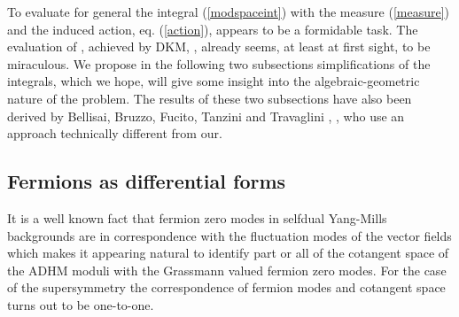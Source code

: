\documentclass[a4paper,12pt]{article}
\begin{document}
To evaluate for general \coordHE{} the integral (\ref{modspaceint}) with 
the measure (\ref{measure}) and the induced action, eq. 
(\ref{action}), appears to be a formidable task. The evaluation 
of \coordHE{}, achieved by DKM, \cite{dorey1}, already seems, at 
least at first 
sight, to be miraculous. We propose in the following two 
subsections simplifications of the integrals, which we hope, will 
give some insight into the algebraic-geometric nature of the 
problem. The results of these two subsections have also 
been derived by Bellisai, Bruzzo, Fucito, Tanzini and Travaglini 
\cite{tanzini1}, \cite{tanzini2}, who use an  approach technically 
different from our.  

\subsection{Fermions as differential forms}

It is a well known fact that fermion zero modes in selfdual Yang-Mills 
backgrounds are in correspondence with the fluctuation modes of the 
vector fields which makes it appearing natural to identify part or 
all of the cotangent space of the ADHM moduli with the Grassmann 
valued fermion zero modes. For 
the case of the \coordHE{} supersymmetry the correspondence of 
fermion modes and cotangent space turns out to be one-to-one. 
\end{document}
